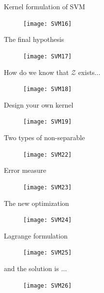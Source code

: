 \begin{frame}{Kernel formulation of SVM}
\begin{figure}
\texttt{[image: SVM16]}
\end{figure}
\end{frame}

\begin{frame}{The final hypothesis}
\begin{figure}
\texttt{[image: SVM17]}
\end{figure}
\end{frame}

\begin{frame}{How do we know that $\mathcal{Z}$ exists...}
\begin{figure}
\texttt{[image: SVM18]}
\end{figure}
\end{frame}

\begin{frame}{Design your own kernel}
\begin{figure}
\texttt{[image: SVM19]}
\end{figure}
\end{frame}

\begin{frame}{Two types of non-separable}
\begin{figure}
\texttt{[image: SVM22]}
\end{figure}
\end{frame}

\begin{frame}{Error measure}
\begin{figure}
\texttt{[image: SVM23]}
\end{figure}
\end{frame}

\begin{frame}{The new optimization}
\begin{figure}
\texttt{[image: SVM24]}
\end{figure}
\end{frame}

\begin{frame}{Lagrange formulation}
\begin{figure}
\texttt{[image: SVM25]}
\end{figure}
\end{frame}

\begin{frame}{and the solution is ...}
\begin{figure}
\texttt{[image: SVM26]}
\end{figure}
\end{frame}

